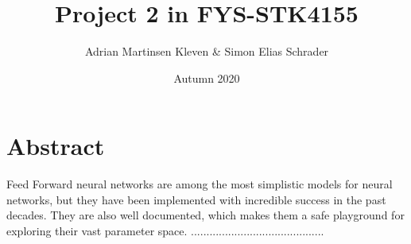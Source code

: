 \documentclass[11pt,a4paper,titlepage]{article}
\title{Project 2 in FYS-STK4155}
\author{Adrian Martinsen Kleven & Simon Elias Schrader }
\date{Autumn 2020}
\begin{document}
\tableofcontents
\listoffigures
\listoftables

\clearpage
\section{Abstract}
Feed Forward neural networks are among the most simplistic models for neural networks, but they have been implemented with incredible success in the past decades. They are also well documented, which makes them a safe playground for exploring their vast parameter space. ...........................................
\end{document}
